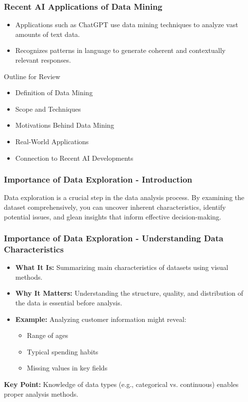 \documentclass[aspectratio=169]{beamer}
\begin{document}
\begin{frame}[fragile]
    \frametitle{Recent AI Applications of Data Mining}
    \begin{itemize}
        \item Applications such as ChatGPT use data mining techniques to analyze vast amounts of text data.
        \item Recognizes patterns in language to generate coherent and contextually relevant responses.
    \end{itemize}
    \begin{block}{Outline for Review}
        \begin{itemize}
            \item Definition of Data Mining
            \item Scope and Techniques
            \item Motivations Behind Data Mining
            \item Real-World Applications
            \item Connection to Recent AI Developments
        \end{itemize}
    \end{block}
\end{frame}

\begin{frame}[fragile]
    \frametitle{Importance of Data Exploration - Introduction}
    Data exploration is a crucial step in the data analysis process. 
    By examining the dataset comprehensively, you can uncover inherent characteristics, identify potential issues, and glean insights that inform effective decision-making.
\end{frame}

\begin{frame}[fragile]
    \frametitle{Importance of Data Exploration - Understanding Data Characteristics}
    \begin{itemize}
        \item \textbf{What It Is:} Summarizing main characteristics of datasets using visual methods.
        \item \textbf{Why It Matters:} Understanding the structure, quality, and distribution of the data is essential before analysis.
        \item \textbf{Example:} Analyzing customer information might reveal:
            \begin{itemize}
                \item Range of ages
                \item Typical spending habits
                \item Missing values in key fields
            \end{itemize}
    \end{itemize}
    
    \textbf{Key Point:} Knowledge of data types (e.g., categorical vs. continuous) enables proper analysis methods.
\end{frame}
\end{document}
